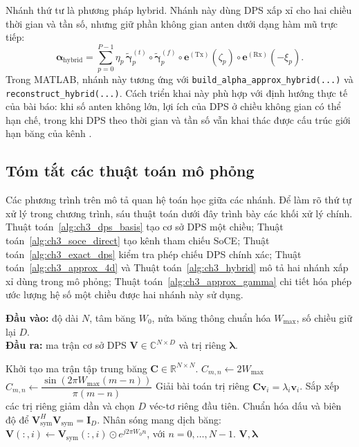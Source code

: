 Nhánh thứ tư là phương pháp hybrid. Nhánh này dùng DPS xấp xỉ cho hai chiều thời gian và tần số, nhưng giữ phần không gian anten dưới dạng hàm mũ trực tiếp:
\begin{equation}
\boldsymbol{\alpha}_{\mathrm{hybrid}}
=
\sum_{p=0}^{P-1}
\eta_p\,
\widetilde{\boldsymbol{\gamma}}^{(t)}_p
\circ
\widetilde{\boldsymbol{\gamma}}^{(f)}_p
\circ
\mathbf{e}^{(\mathrm{Tx})}(\zeta_p)
\circ
\mathbf{e}^{(\mathrm{Rx})}(-\xi_p).
\label{eq:ch3_hybrid_alpha}
\end{equation}
Trong MATLAB, nhánh này tương ứng với \texttt{build\_alpha\_approx\_hybrid(...)} và \texttt{reconstruct\_hybrid(...)}. Cách triển khai này phù hợp với định hướng thực tế của bài báo: khi số anten không lớn, lợi ích của DPS ở chiều không gian có thể hạn chế, trong khi DPS theo thời gian và tần số vẫn khai thác được cấu trúc giới hạn băng của kênh \cite{Kaltenberger2007}.

\subsection{Tóm tắt các thuật toán mô phỏng}
\label{subsec:ch3_algorithm_summaries}

Các phương trình trên mô tả quan hệ toán học giữa các nhánh. Để làm rõ thứ tự xử lý trong chương trình, sáu thuật toán dưới đây trình bày các khối xử lý chính. Thuật toán~\ref{alg:ch3_dps_basis} tạo cơ sở DPS một chiều; Thuật toán~\ref{alg:ch3_soce_direct} tạo kênh tham chiếu SoCE; Thuật toán~\ref{alg:ch3_exact_dps} kiểm tra phép chiếu DPS chính xác; Thuật toán~\ref{alg:ch3_approx_4d} và Thuật toán~\ref{alg:ch3_hybrid} mô tả hai nhánh xấp xỉ dùng trong mô phỏng; Thuật toán~\ref{alg:ch3_approx_gamma} chi tiết hóa phép ước lượng hệ số một chiều được hai nhánh này sử dụng.

\begin{algorithm}[H]
\caption{Sinh cơ sở DPS dịch băng cho một chiều}
\label{alg:ch3_dps_basis}
\textbf{Đầu vào:} độ dài \(N\), tâm băng \(W_0\), nửa băng thông chuẩn hóa \(W_{\max}\), số chiều giữ lại \(D\).\\
\textbf{Đầu ra:} ma trận cơ sở DPS \(\mathbf{V}\in\mathbb{C}^{N\times D}\) và trị riêng \(\boldsymbol{\lambda}\).
\begin{algorithmic}[1]
\State Khởi tạo ma trận tập trung băng \(\mathbf{C}\in\mathbb{R}^{N\times N}\).
            \State \(C_{m,n}\gets2W_{\max}\)
        \Else
            \State \(C_{m,n}\gets\dfrac{\sin\!\left(2\pi W_{\max}(m-n)\right)}{\pi(m-n)}\)
        \EndIf
    \EndFor
\EndFor
\State Giải bài toán trị riêng \(\mathbf{C}\mathbf{v}_i=\lambda_i\mathbf{v}_i\).
\State Sắp xếp các trị riêng giảm dần và chọn \(D\) véc-tơ riêng đầu tiên.
\State Chuẩn hóa dấu và biên độ để \(\mathbf{V}_{\mathrm{sym}}^H\mathbf{V}_{\mathrm{sym}}=\mathbf{I}_D\).
\State Nhân sóng mang dịch băng: \(\mathbf{V}(:,i)\gets\mathbf{V}_{\mathrm{sym}}(:,i)\odot e^{j2\pi W_0 n}\), với \(n=0,\ldots,N-1\).
\State \Return \(\mathbf{V},\boldsymbol{\lambda}\)
\end{algorithmic}
\end{algorithm}

